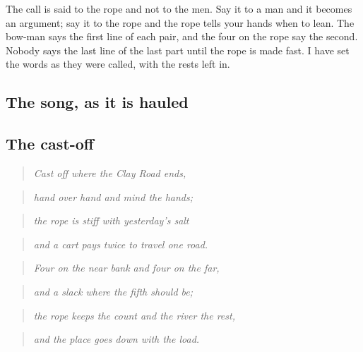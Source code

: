 \documentclass{design/chronicle}
\begin{document}
The call is said to the rope and not to the men. Say it to a man and it becomes an argument; say it to the rope and the rope tells your hands when to lean. The bow-man says the first line of each pair, and the four on the rope say the second. Nobody says the last line of the last part until the rope is made fast. I have set the words as they were called, with the rests left in.

\subsection*{The song, as it is hauled}

\subsection*{The cast-off}

\begin{quote}\itshape Cast off where the Clay Road ends,\end{quote}

\begin{quote}\itshape hand over hand and mind the hands;\end{quote}

\begin{quote}\itshape the rope is stiff with yesterday’s salt\end{quote}

\begin{quote}\itshape and a cart pays twice to travel one road.\end{quote}

\begin{quote}\itshape \end{quote}

\begin{quote}\itshape Four on the near bank and four on the far,\end{quote}

\begin{quote}\itshape and a slack where the fifth should be;\end{quote}

\begin{quote}\itshape the rope keeps the count and the river the rest,\end{quote}

\begin{quote}\itshape and the place goes down with the load.\end{quote}
\end{document}
